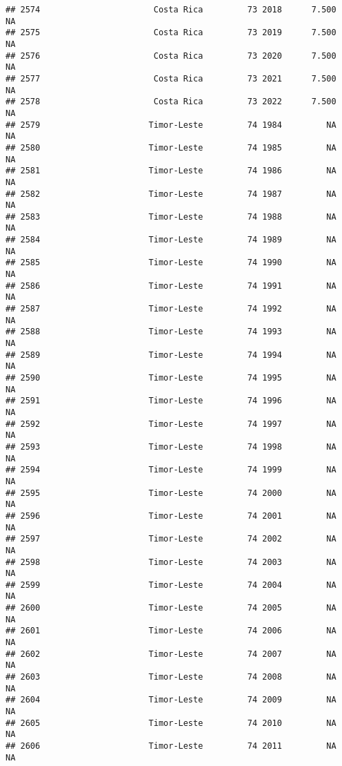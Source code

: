 \documentclass[
]{article}
\begin{document}
\begin{verbatim}
## 2574                       Costa Rica         73 2018      7.500         NA
## 2575                       Costa Rica         73 2019      7.500         NA
## 2576                       Costa Rica         73 2020      7.500         NA
## 2577                       Costa Rica         73 2021      7.500         NA
## 2578                       Costa Rica         73 2022      7.500         NA
## 2579                      Timor-Leste         74 1984         NA         NA
## 2580                      Timor-Leste         74 1985         NA         NA
## 2581                      Timor-Leste         74 1986         NA         NA
## 2582                      Timor-Leste         74 1987         NA         NA
## 2583                      Timor-Leste         74 1988         NA         NA
## 2584                      Timor-Leste         74 1989         NA         NA
## 2585                      Timor-Leste         74 1990         NA         NA
## 2586                      Timor-Leste         74 1991         NA         NA
## 2587                      Timor-Leste         74 1992         NA         NA
## 2588                      Timor-Leste         74 1993         NA         NA
## 2589                      Timor-Leste         74 1994         NA         NA
## 2590                      Timor-Leste         74 1995         NA         NA
## 2591                      Timor-Leste         74 1996         NA         NA
## 2592                      Timor-Leste         74 1997         NA         NA
## 2593                      Timor-Leste         74 1998         NA         NA
## 2594                      Timor-Leste         74 1999         NA         NA
## 2595                      Timor-Leste         74 2000         NA         NA
## 2596                      Timor-Leste         74 2001         NA         NA
## 2597                      Timor-Leste         74 2002         NA         NA
## 2598                      Timor-Leste         74 2003         NA         NA
## 2599                      Timor-Leste         74 2004         NA         NA
## 2600                      Timor-Leste         74 2005         NA         NA
## 2601                      Timor-Leste         74 2006         NA         NA
## 2602                      Timor-Leste         74 2007         NA         NA
## 2603                      Timor-Leste         74 2008         NA         NA
## 2604                      Timor-Leste         74 2009         NA         NA
## 2605                      Timor-Leste         74 2010         NA         NA
## 2606                      Timor-Leste         74 2011         NA         NA

\end{verbatim}
\end{document}
